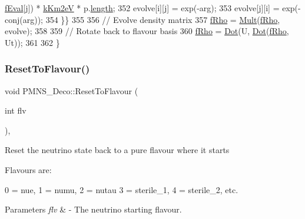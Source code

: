 \begin{DoxyCode}
      \hyperlink{classOscProb_1_1PMNS__Base_a6319c34d7decbb9d7d6da279c06e8c2d}{fEval}[j]) * \hyperlink{classOscProb_1_1PMNS__Base_a382ddd7b76ca89b43f22614a2ea7327b}{kKm2eV} * p.\hyperlink{structOscProb_1_1NuPath_af22660894b6e25cf835500381b155557}{length};
352     evolve[i][j] = exp(-arg);
353     evolve[j][i] = exp(-conj(arg));
354   \}\}
355   
356   \textcolor{comment}{// Evolve density matrix}
357   \hyperlink{classOscProb_1_1PMNS__Deco_a0488d62b4ef4cf5b43425769f5fcdbdf}{fRho} = \hyperlink{classOscProb_1_1PMNS__Deco_aacc9909556ca22aca30620893e12b0db}{Mult}(\hyperlink{classOscProb_1_1PMNS__Deco_a0488d62b4ef4cf5b43425769f5fcdbdf}{fRho}, evolve);
358   
359   \textcolor{comment}{// Rotate back to flavour basis}
360   \hyperlink{classOscProb_1_1PMNS__Deco_a0488d62b4ef4cf5b43425769f5fcdbdf}{fRho} = \hyperlink{classOscProb_1_1PMNS__Deco_a8d6b547de294c0d52d4208bde44fe171}{Dot}(U, \hyperlink{classOscProb_1_1PMNS__Deco_a8d6b547de294c0d52d4208bde44fe171}{Dot}(\hyperlink{classOscProb_1_1PMNS__Deco_a0488d62b4ef4cf5b43425769f5fcdbdf}{fRho}, Ut));
361 
362 \}
\end{DoxyCode}
\mbox{\label{classOscProb_1_1PMNS__Deco_a393940f176614e3ffebeea40cfe78a62}} 
\subsubsection{\texorpdfstring{Reset\+To\+Flavour()}{ResetToFlavour()}}
{\footnotesize\ttfamily void P\+M\+N\+S\+\_\+\+Deco\+::\+Reset\+To\+Flavour (\begin{DoxyParamCaption}\item[{int}]{flv }\end{DoxyParamCaption})\hspace{0.3cm}{\ttfamily [protected]}, {\ttfamily [virtual]}}

Reset the neutrino state back to a pure flavour where it starts

Flavours are\+: 
\begin{DoxyPre}
  0 = nue, 1 = numu, 2 = nutau
  3 = sterile\_1, 4 = sterile\_2, etc.
\end{DoxyPre}
 
\begin{DoxyParams}{Parameters}
{\em flv} & -\/ The neutrino starting flavour. \\
\hline
\end{DoxyParams}


